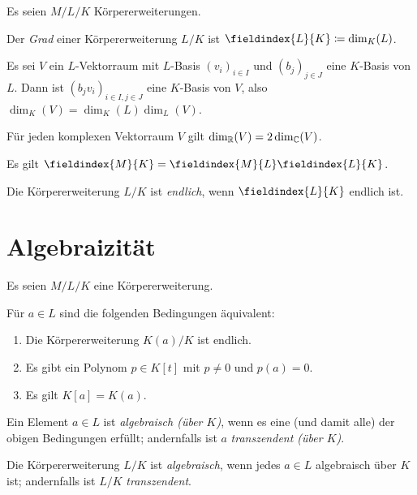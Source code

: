 Es seien $M/L/K$ Körpererweiterungen.

\begin{definition}
  Der \emph{Grad} einer Körpererweiterung $L/K$ ist $\fieldindex{L}{K} \defined \dim_K(L)$.
\end{definition}

\begin{lemma}
  Es sei $V$ ein $L$-Vektorraum mit $L$-Basis $(v_i)_{i \in I}$ und $(b_j)_{j \in J}$ eine $K$-Basis von $L$.
  Dann ist $(b_j v_i)_{i \in I, j \in J}$ eine $K$-Basis von $V$, also $\dim_K(V) = \dim_K(L) \dim_L(V)$.
\end{lemma}

\begin{example}
  Für jeden komplexen Vektorraum $V$ gilt $\dim_{\mathbb{R}}(V) = 2 \dim_{\mathbb{C}}(V)$.
\end{example}

\begin{corollary}
  Es gilt $\fieldindex{M}{K} = \fieldindex{M}{L} \fieldindex{L}{K}$.
\end{corollary}

\begin{definition}
  Die Körpererweiterung $L/K$ ist \emph{endlich}, wenn $\fieldindex{L}{K}$ endlich ist.
\end{definition}





\section{Algebraizität}

Es seien $M/L/K$ eine Körpererweiterung.

\begin{lemma}
  Für $a \in L$ sind die folgenden Bedingungen äquivalent:
  \begin{enumerate}
    \item
      Die Körpererweiterung $K(a)/K$ ist endlich.
    \item
      Es gibt ein Polynom $p \in K[t]$ mit $p \neq 0$ und $p(a) = 0$.
    \item
      Es gilt $K[a] = K(a)$.
  \end{enumerate}
\end{lemma}

\begin{definition}
  Ein Element $a \in L$ ist \emph{algebraisch \textup(über $K$\textup)}, wenn es eine \textup(und damit alle\textup) der obigen Bedingungen erfüllt;
  andernfalls ist $a$ \emph{transzendent \textup(über $K$\textup)}.
  
  Die Körpererweiterung $L/K$ ist \emph{algebraisch}, wenn jedes $a \in L$ algebraisch über $K$ ist;
  andernfalls ist $L/K$ \emph{transzendent}.
\end{definition}


